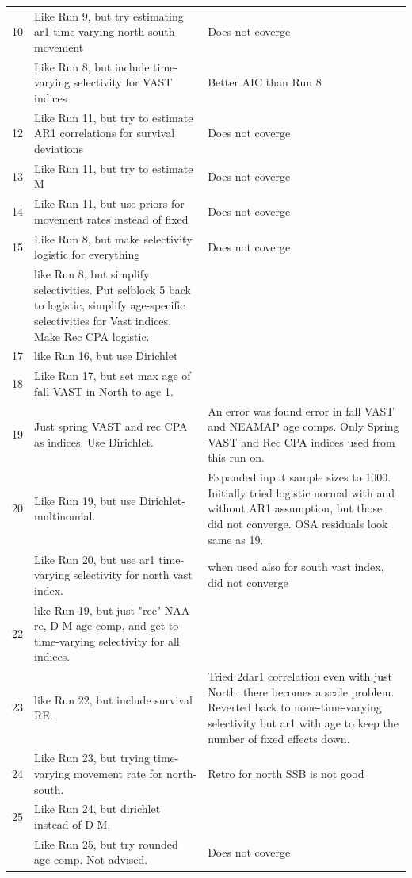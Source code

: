 \documentclass[
]{article}
\begin{document}
\begin{landscape}
\begin{longtable}[t]{l>{\raggedright\arraybackslash}p{10cm}>{\raggedright\arraybackslash}p{12cm}}
10 & Like Run 9, but try estimating ar1 time-varying north-south movement & Does not coverge\\
\addlinespace
11 & Like Run 8, but include time-varying selectivity for VAST indices & Better AIC than Run 8\\
12 & Like Run 11, but try to estimate AR1 correlations for survival deviations & Does not coverge\\
13 & Like Run 11, but try to estimate M & Does not coverge\\
14 & Like Run 11, but use priors for movement rates instead of fixed & Does not coverge\\
15 & Like Run 8, but make selectivity logistic for everything & Does not coverge\\
\addlinespace
16 & like Run 8,  but simplify selectivities. Put selblock 5 back to logistic, simplify age-specific selectivities for Vast indices. Make Rec CPA logistic. & \\
17 & like Run 16, but use Dirichlet & \\
18 & Like Run 17, but set max age of fall VAST in North to age 1. & \\
19 & Just spring VAST and rec CPA as indices. Use Dirichlet. & An error was found error in fall VAST and NEAMAP age comps. Only Spring VAST and Rec CPA indices used from this run on.\\
20 & Like Run 19, but use Dirichlet-multinomial. & Expanded input sample sizes to 1000. Initially tried logistic normal with and without AR1 assumption, but those did not converge. OSA residuals look same as 19.\\
\addlinespace
21 & Like Run 20, but use ar1 time-varying selectivity for north vast index. & when used also for south vast index, did not converge\\
22 & like Run 19, but just "rec" NAA re, D-M age comp, and get to time-varying selectivity for all indices. & \\
23 & like Run 22, but include survival RE. & Tried 2dar1 correlation even with just North. there becomes a scale problem. Reverted back to none-time-varying selectivity but ar1 with age to keep the number of fixed effects down.\\
24 & Like Run 23, but trying time-varying movement rate for north-south. & Retro for north SSB is not good\\
25 & Like Run 24, but dirichlet instead of D-M. & \\
\addlinespace
26 & Like Run 25, but try rounded age comp. Not advised. & Does not coverge\\

\end{longtable}
\end{landscape}
\end{document}
